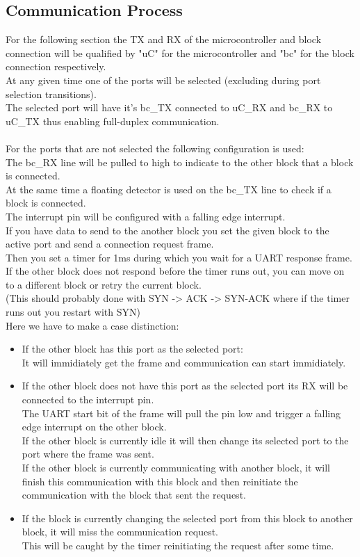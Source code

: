 \subsection{Communication Process}

For the following section the TX and RX of the microcontroller and block connection will be qualified by "uC" for the microcontroller and "bc" for the block connection respectively.\\
At any given time one of the ports will be selected (excluding during port selection transitions).\\
The selected port will have it's bc\_TX connected to uC\_RX and bc\_RX to uC\_TX thus enabling full-duplex communication.\\ \\
For the ports that are not selected the following configuration is used:\\
The bc\_RX line will be pulled to high to indicate to the other block that a block is connected.\\
At the same time a floating detector is used on the bc\_TX line to check if a block is connected.\\
The interrupt pin will be configured with a falling edge interrupt.\\
If you have data to send to the another block you set the given block to the active port and send a connection request frame.\\
Then you set a timer for 1ms during which you wait for a UART response frame.\\
If the other block does not respond before the timer runs out, you can move on to a different block or retry the current block.\\
(This should probably done with SYN -> ACK -> SYN-ACK where if the timer runs out you restart with SYN)\\
Here we have to make a case distinction:
\begin{itemize}
  \item If the other block has this port as the selected port:\\
    It will immidiately get the frame and communication can start immidiately.
  \item If the other block does not have this port as the selected port its RX will be connected to the interrupt pin.\\ 
    The UART start bit of the frame will pull the pin low and trigger a falling edge interrupt on the other block.\\
    If the other block is currently idle it will then change its selected port to the port where the frame was sent.\\
    If the other block is currently communicating with another block, it will finish this communication with this block and then reinitiate the communication with the block that sent the request.
  \item If the block is currently changing the selected port from this block to another block, it will miss the communication request.\\
    This will be caught by the timer reinitiating the request after some time.
\end{itemize}

